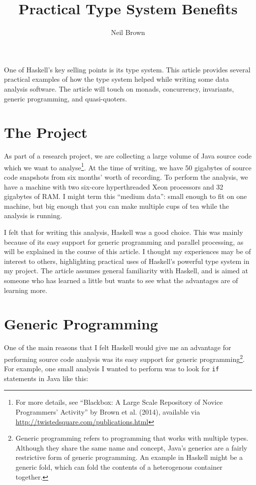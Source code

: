 \documentclass{tmr}
\title{Practical Type System Benefits}
\author{Neil Brown\email{neil@twistedsquare.com}}
\begin{document}
\begin{introduction} 
One of Haskell's key selling points is its type system.  This article provides several practical examples of how the type system helped while writing some data analysis software.  The article will touch on monads, concurrency, invariants, generic programming, and quasi-quoters.
\end{introduction}

\section{The Project}

As part of a research project, we are collecting a large volume of Java source code which we want to analyse\footnote{For more details, see ``Blackbox: A Large Scale Repository of Novice Programmers' Activity'' by Brown et al. (2014), available via \url{http://twistedsquare.com/publications.html}}.  At the time of writing, we have 50 gigabytes of source code snapshots from six months' worth of recording.  To perform the analysis, we have a machine with two six-core hyperthreaded Xeon processors and 32 gigabytes of RAM\@.  I might term this ``medium data'': small enough to fit on one machine, but big enough that you can make multiple cups of tea while the analysis is running.

I felt that for writing this analysis, Haskell was a good choice.  This was mainly because of its easy support for generic programming and parallel processing, as will be explained in the course of this article.  I thought my experiences may be of interest to others, highlighting practical uses of Haskell's powerful type system in my project.  The article assumes general familiarity with Haskell, and is aimed at someone who has learned a little but wants to see what the advantages are of learning more.


\section{Generic Programming}

One of the main reasons that I felt Haskell would give me an advantage for performing source code analysis was its easy support for generic programming\footnote{Generic programming refers to programming that works with multiple types.  Although they share the same name and concept, Java's generics are a fairly restrictive form of generic programming.  An example in Haskell might be a generic fold, which can fold the contents of a heterogenous container together.}. For example, one small analysis I wanted to perform was to look for \lstinline|if| statements in Java like this:
\end{document}
